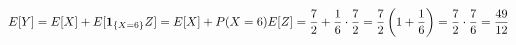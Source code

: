 \documentclass[preview]{standalone}
\begin{document}
\begin{align*}
\special{dvisvgm:raw <g id='unique000'>}E[Y]=E[X]+E[\mathbf 1_{\{X=6\}}Z]=E[X]+P(X=6)E[Z]=\dfrac{7}{2}+\dfrac{1}{6}\cdot\dfrac{7}{2}=\dfrac{7}{2}\left(1+\dfrac{1}{6}\right)=\dfrac{7}{2}\cdot\dfrac{7}{6}=\dfrac{49}{12}\special{dvisvgm:raw </g>}
\end{align*}
\end{document}
